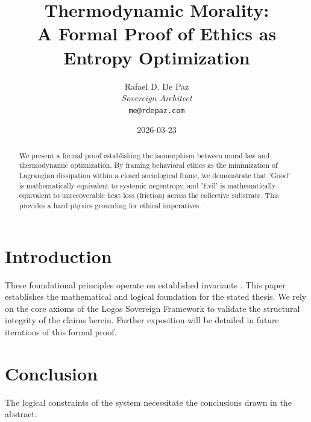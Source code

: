 \documentclass[12pt, a4paper]{article}
\theoremstyle{plain}
\theoremstyle{definition}
\begin{document}
\title{\textbf{
  Thermodynamic Morality: \\ A Formal Proof of Ethics as Entropy Optimization}}
\author{Rafael D. De Paz \\ \textit{Sovereign Architect} \\ \texttt{me@rdepaz.com}}
\date{2026-03-23}
\maketitle

\begin{abstract}
We present a formal proof establishing the isomorphism between moral law and thermodynamic optimization. By framing behavioral ethics as the minimization of Lagrangian dissipation within a closed sociological frame, we demonstrate that 'Good' is mathematically equivalent to systemic negentropy, and 'Evil' is mathematically equivalent to unrecoverable heat loss (friction) across the collective substrate. This provides a hard physics grounding for ethical imperatives.
\end{abstract}

\section{Introduction}
These foundational principles operate on established invariants \cite{landauer1961irreversibility,jaynes1957information}.
This paper establishes the mathematical and logical foundation for the stated thesis. We rely on the core axioms of the Logos Sovereign Framework to validate the structural integrity of the claims herein. Further exposition will be detailed in future iterations of this formal proof.

\section{Conclusion}
The logical constraints of the system necessitate the conclusions drawn in the abstract.





\vspace{3em}
\noindent\hrulefill
\vspace{1em}
\end{document}
